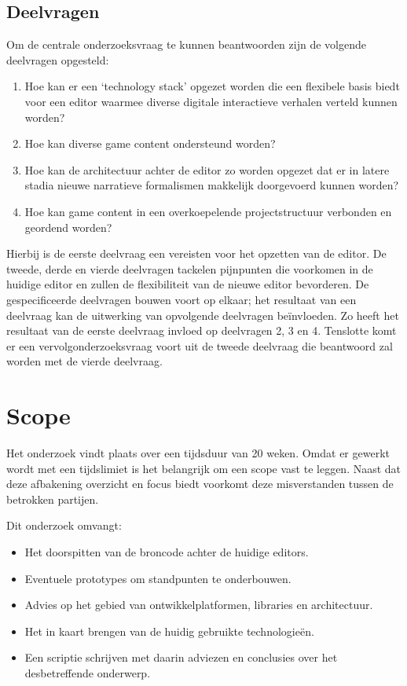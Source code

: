 \subsection{Deelvragen}
Om de centrale onderzoeksvraag te kunnen beantwoorden zijn de volgende deelvragen opgesteld:
\begin{enumerate}
    \item Hoe kan er een ‘technology stack’ opgezet worden die een flexibele basis biedt voor een editor waarmee diverse digitale interactieve verhalen verteld kunnen worden?
    \item Hoe kan diverse game content ondersteund worden?
    \item Hoe kan de architectuur achter de editor zo worden opgezet dat er in latere stadia nieuwe narratieve formalismen makkelijk doorgevoerd kunnen worden?
    \item Hoe kan game content in een overkoepelende projectstructuur verbonden en geordend worden?
\end{enumerate}
Hierbij is de eerste deelvraag een vereisten voor het opzetten van de editor. De tweede, derde en vierde deelvragen tackelen pijnpunten die voorkomen in de huidige editor en zullen de flexibiliteit van de nieuwe editor bevorderen. De gespecificeerde deelvragen bouwen voort op elkaar; het resultaat van een deelvraag kan de uitwerking van opvolgende deelvragen beïnvloeden. Zo heeft het resultaat van de eerste deelvraag invloed op deelvragen 2, 3 en 4. Tenslotte komt er een vervolgonderzoeksvraag voort uit de tweede deelvraag die beantwoord zal worden met de vierde deelvraag.

\pagebreak
\section{Scope}
Het onderzoek vindt plaats over een tijdsduur van 20 weken. Omdat er gewerkt wordt met een tijdslimiet is het belangrijk om een scope vast te leggen. Naast dat deze afbakening overzicht en focus biedt voorkomt deze misverstanden tussen de betrokken partijen.

\noindent Dit onderzoek omvangt:
\begin{itemize}
    \item Het doorspitten van de broncode achter de huidige editors.
    \item Eventuele prototypes om standpunten te onderbouwen.
    \item Advies op het gebied van ontwikkelplatformen, libraries en architectuur.
    \item Het in kaart brengen van de huidig gebruikte technologieën.
    \item Een scriptie schrijven met daarin adviezen en conclusies over het desbetreffende onderwerp.
\end{itemize}

